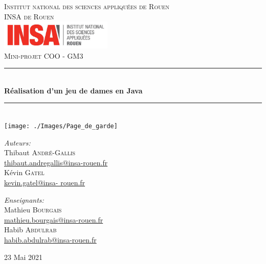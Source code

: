 \documentclass[12,french]{report}
\newcommand{\HRule}{\rule{\linewidth}{0.5mm}}
\begin{document}
\hypersetup{pdfborder=0 0 0}

\begin{titlepage}

\begin{center}
	\textsc{{\LARGE Institut national des sciences appliquées de Rouen} \\ 			\vspace{6mm} {\Large INSA de Rouen}} \\
	\vspace{5mm}
	\includegraphics[width=0.4\textwidth]{./Images/insa}\\[1.0 cm]

	\textsc{\Large Mini-projet COO - GM3}\\[0.6cm]

	\HRule \\[0.5cm]
	{ \Huge \bfseries Réalisation d'un jeu de dames en Java}\\[0.2cm]
	\HRule \\[0.75cm]

	\texttt{[image: ./Images/Page\_de\_garde]}\\[0.9 cm]

	\begin{minipage}{0.4\textwidth}
		\begin{flushleft} \large
			\emph{Auteurs:}\\
			Thibaut \textsc{André-Gallis} \\
			{\small\href{mailto:thibaut.andregallis@insa-rouen.fr}{thibaut.andregallis@insa-rouen.fr}} \\
			Kévin \textsc{Gatel} \\
			{\small\href{mailto:kevin.gatel@insa-rouen.fr}{kevin.gatel@insa-				rouen.fr}}
		\end{flushleft}
	\end{minipage}
	\begin{minipage}{0.4\textwidth}
		\begin{flushright} \large
			\emph{Enseignants:} \\
			Mathieu \textsc{Bourgais} \\
			{\small\href{mailto:mathieu.bourgais@insa-rouen.fr}								{mathieu.bourgais@insa-rouen.fr}}\\
			Habib \textsc{Abdulrab} \\
			{\small\href{mailto:habib.abdulrab@insa-rouen.fr}{habib.abdulrab@insa-rouen.fr}}
		\end{flushright}
	\end{minipage}

	\vfill
	{\large 23 Mai 2021}
\end{center}
\end{titlepage}
\end{document}
